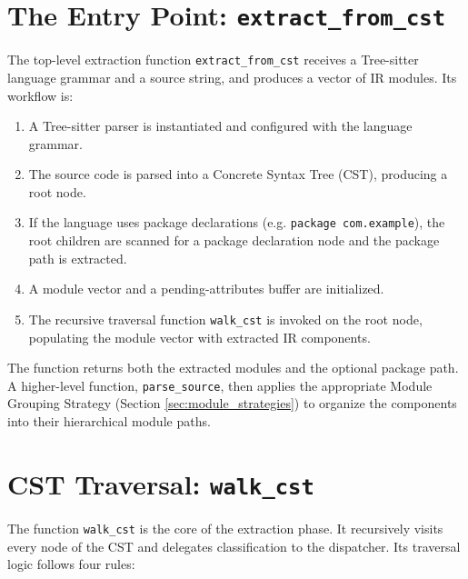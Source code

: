 \section{The Entry Point: \texttt{extract\_from\_cst}}
\label{sec:extract_from_cst}

The top-level extraction function \texttt{extract\_from\_cst} receives
a Tree-sitter language grammar and a source string, and
produces a vector of IR modules. Its workflow is:
\begin{enumerate}
  \item A Tree-sitter parser is instantiated and configured with the
    language grammar.
  \item The source code is parsed into a Concrete Syntax Tree (CST),
    producing a root node.
  \item If the language uses package declarations (e.g.
    \texttt{package com.example}), the root children are scanned for
    a package declaration node and the package path is extracted.
  \item A module vector and a pending-attributes buffer are initialized.
  \item The recursive traversal function \texttt{walk\_cst} is
    invoked on the root node, populating the module vector with
    extracted IR components.
\end{enumerate}

The function returns both the extracted modules and the optional
package path. A higher-level function, \texttt{parse\_source}, then
applies the appropriate Module Grouping Strategy (Section
\ref{sec:module_strategies}) to organize the components into their
hierarchical module paths.

\section{CST Traversal: \texttt{walk\_cst}}
\label{sec:walk_cst}

The function \texttt{walk\_cst} is the core of the extraction phase.
It recursively visits every node of the CST and delegates
classification to the dispatcher. Its traversal logic follows four rules:

